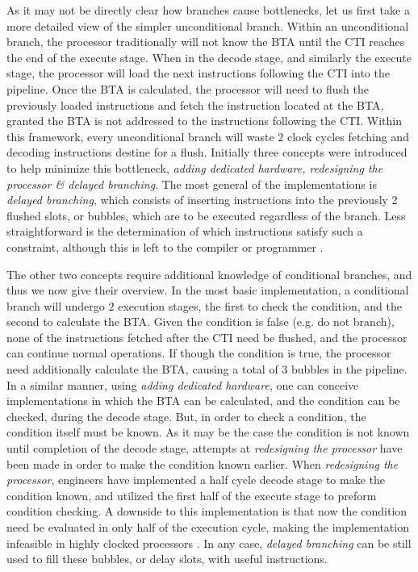 \documentclass{article}
\begin{document}
As it may not be directly clear how branches cause bottlenecks, let us first take a more detailed view of the simpler unconditional branch. 
Within an unconditional branch, the processor traditionally will not know the BTA until the CTI reaches the end of the execute stage. 
When in the decode stage, and similarly the execute stage, the processor will load the next instructions following the CTI into the pipeline. 
Once the BTA is calculated, the processor will need to flush the previously loaded instructions and fetch the instruction located at the BTA, granted the BTA is not addressed to the instructions following the CTI. 
Within this framework, every unconditional branch will waste $2$ clock cycles fetching and decoding instructions destine for a flush.
Initially three concepts were introduced to help minimize this bottleneck, \emph{adding dedicated hardware, redesigning the processor \& delayed branching}. 
The most general of the implementations is \emph{delayed branching}, which consists of inserting instructions into the previously 2 flushed slots, or bubbles, which are to be executed regardless of the branch. 
Less straightforward is the determination of which instructions satisfy such a constraint, although this is left to the compiler or programmer \cite{Sima}. 

The other two concepts require additional knowledge of conditional branches, and thus we now give their overview. 
In the most basic implementation, a conditional branch will undergo $2$ execution stages, the first to check the condition, and the second to calculate the BTA. 
Given the condition is false (e.g. do not branch), none of the instructions fetched after the CTI need be flushed, and the processor can continue normal operations. 
If though the condition is true, the processor need additionally calculate the BTA, causing a total of $3$ bubbles in the pipeline. 
In a similar manner, using \emph{adding dedicated hardware}, one can conceive implementations in which the BTA can be calculated, and the condition can be checked, during the decode stage.
But, in order to check a condition, the condition itself must be known. 
As it may be the case the condition is not known until completion of the decode stage, attempts at \emph{redesigning the processor} have been made in order to make the condition known earlier. 
When \emph{redesigning the processor}, engineers have implemented a half cycle decode stage to make the condition known, and utilized the first half of the execute stage to preform condition checking. 
A downside to this implementation is that now the condition need be evaluated in only half of the execution cycle, making the implementation infeasible in highly clocked processors \cite{Sima}.
In any case, \emph{delayed branching} can be still used to fill these bubbles, or delay slots, with useful instructions. 
\end{document}
